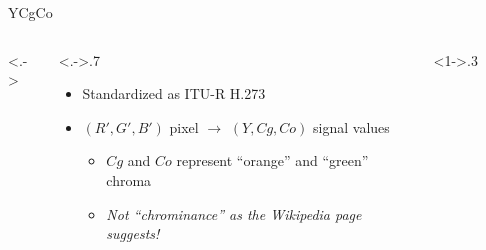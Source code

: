 \documentclass[aspectratio=169,handout,usepdftitle=false]{fireshonks}
\begin{document}
\begin{frame}{YCgCo}
    \begin{columns}<.->
        \begin{column}<.->{.7\textwidth}
            \begin{itemize}
                \item Standardized as ITU-R H.273 \parencite*{ycocg}
                \item $(R', G', B')$ pixel $\rightarrow$ $(Y, Cg, Co)$ signal values
                      \begin{itemize}
                          \item $Cg$ and $Co$ represent \enquote{orange} and \enquote{green} chroma
                          \item \emph{Not \enquote{chrominance} as the Wikipedia page suggests!}
                      \end{itemize}
            \end{itemize}
        \end{column}
        \begin{column}<1->{.3\textwidth}
            \begin{figure}

\end{figure}
\end{column}
\end{columns}
\end{frame}
\end{document}
